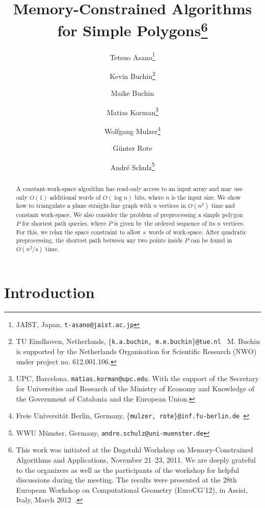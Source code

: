 \documentclass[11pt,a4paper]{article}
\begin{document}
\title{Memory-Constrained Algorithms for Simple Polygons\thanks{This work was initiated at the Dagstuhl Workshop on
Memory-Constrained Algorithms and Applications,
 November 21--23, 2011. We are deeply grateful
to the organizers as well as the participants of the workshop for
helpful discussions during the meeting.
The results were presented
at the
28th European Workshop on Computational Geometry (EuroCG'12), in Assisi, Italy, March 2012~\cite{abbkmrs-mcasp-12}.}}

\author{
Tetsuo Asano\thanks{JAIST, Japan, \texttt{t-asano@jaist.ac.jp}} \and
Kevin Buchin\thanks{TU Eindhoven, Netherlands, \{\texttt{k.a.buchin, m.e.buchin}\}\texttt{@tue.nl } M. Buchin is supported by the Netherlands Organisation for Scientific Research
(NWO) under project no. 612.001.106. } \and
Maike Buchin\footnotemark[3] \and
Matias Korman\thanks{UPC, Barcelona. {\tt{matias.korman@upc.edu}}. With the support of the Secretary for Universities and
Research of the Ministry of Economy and Knowledge of the Government of Catalonia and the European Union.} \and
Wolfgang Mulzer\thanks{Freie Universit\"at Berlin,
Germany, \{\texttt{mulzer, rote}\}\texttt{@inf.fu-berlin.de } } \and
G\"unter Rote\footnotemark[5] \and
Andr\'e Schulz\thanks{WWU M\"unster, Germany, \texttt{andre.schulz@uni-muenster.de} }
}


\maketitle

\begin{abstract}
A constant-work-space algorithm has read-only access
to an input array and may use only $O(1)$ additional
words of $O(\log n)$ bits, where $n$ is the input size.
We show how to triangulate a
plane straight-line graph with $n$ vertices in $O(n^2)$ time and constant work-space.
We also consider the problem of preprocessing a simple
polygon $P$ for shortest path queries, where $P$ is given by
the ordered sequence of its $n$ vertices.
For this, we relax the space constraint to allow $s$~words of work-space.
After quadratic preprocessing, the shortest path
between any two points inside $P$ can be found in $O(n^2/s)$ time.
\end{abstract}


\section{Introduction}
\label{sec:intro}
\end{document}
